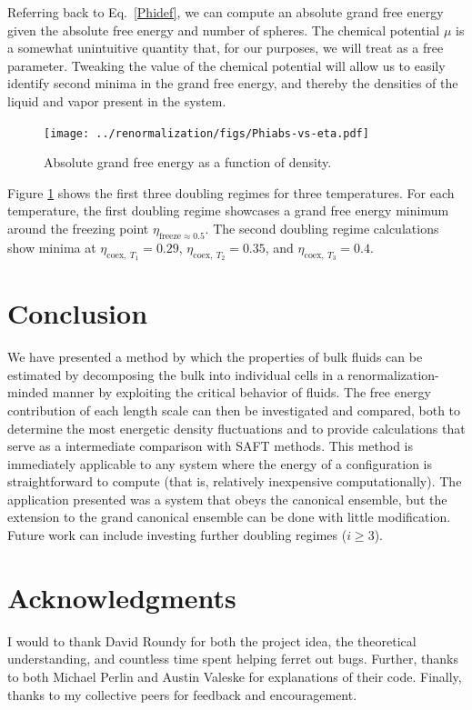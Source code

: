 \documentclass[12pt]{article}
\begin{document}
Referring back to Eq.~\ref{Phidef}, we can compute an absolute grand free energy given the absolute free energy and number of spheres. The chemical potential $\mu$ is a somewhat unintuitive quantity that, for our purposes, we will treat as a free parameter. Tweaking the value of the chemical potential will allow us to easily identify second minima in the grand free energy, and thereby the densities of the liquid and vapor present in the system.
\begin{figure}[H]
\centering
    \texttt{[image: ../renormalization/figs/Phiabs-vs-eta.pdf]}
    \caption{Absolute grand free energy as a function of density.}
    \label{Phi-eta}
\end{figure}
Figure \ref{Phi-eta} shows the first three doubling regimes for three temperatures. For each temperature, the first doubling regime showcases a grand free energy minimum around the freezing point $\eta_{\text{freeze}\approx 0.5}$. The second doubling regime calculations show minima at $\eta_{\text{coex},~T_1} = 0.29$, $\eta_{\text{coex},~T_2} = 0.35$, and $\eta_{\text{coex},~T_3} = 0.4$. 


\section{Conclusion}
We have presented a method by which the properties of bulk fluids can be estimated by decomposing the bulk into individual cells in a renormalization-minded manner by exploiting the critical behavior of fluids. The free energy contribution of each length scale can then be investigated and compared, both to determine the most energetic density fluctuations and to provide calculations that serve as a intermediate comparison with SAFT methods. This method is immediately applicable to any system where the energy of a configuration is straightforward to compute (that is, relatively inexpensive computationally). The application presented was a system that obeys the canonical ensemble, but the extension to the grand canonical ensemble can be done with little modification. Future work can include investing further doubling regimes ($i\geq 3$). 

\section{Acknowledgments}
I would to thank David Roundy for both the project idea, the theoretical understanding, and countless time spent helping ferret out bugs. Further, thanks to both Michael Perlin and Austin Valeske for explanations of their code. Finally, thanks to my collective peers for feedback and encouragement.
%
\cleardoublepage

\end{document}
